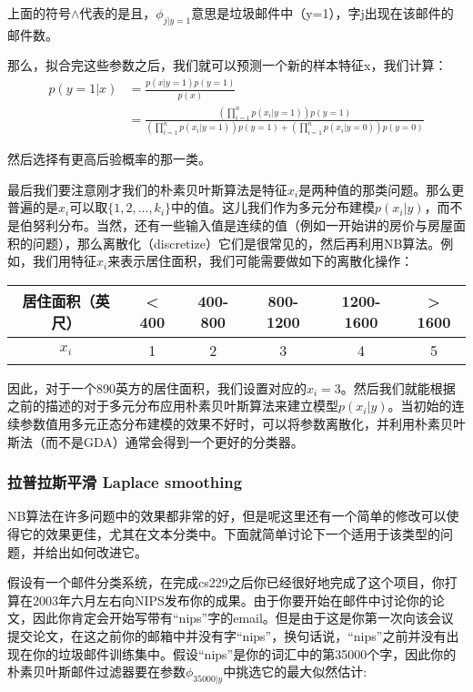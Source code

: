 \documentclass[UTF8]{ctexart}
\begin{document}
上面的符号$\land$代表的是且，$\phi_{j|y=1}$意思是垃圾邮件中（y=1），字j出现在该邮件的邮件数。

那么，拟合完这些参数之后，我们就可以预测一个新的样本特征x，我们计算：
\begin{align*}
p(y=1|x) & = \frac{p(x|y=1)p(y=1)}{p(x)}\\
& = \frac{(\prod_{i=1}^{n}p(x_{i}|y=1))p(y=1)}{(\prod_{i=1}^{n}p(x_{i}|y=1))p(y=1) + (\prod_{i=1}^{n}p(x_{i}|y=0))p(y=0)}
\end{align*}

然后选择有更高后验概率的那一类。


最后我们要注意刚才我们的朴素贝叶斯算法是特征$x_{i}$是两种值的那类问题。那么更普遍的是$x_{i}$可以取$\{1,2,...,k_{i}\}$中的值。这儿我们作为多元分布建模$p(x_{i}|y)$，而不是伯努利分布。当然，还有一些输入值是连续的值（例如一开始讲的房价与房屋面积的问题），那么离散化（discretize）它们是很常见的，然后再利用NB算法。例如，我们用特征$x_{i}$来表示居住面积，我们可能需要做如下的离散化操作：

\begin{tabular}{c|c|c|c|c|c}
居住面积（英尺）& < 400 & 400-800 & 800-1200 & 1200-1600 & > 1600 \\
\hline
$x_{i}$ & 1 & 2 & 3 & 4 & 5
\end{tabular}


因此，对于一个890英方的居住面积，我们设置对应的$x_{i}=3$。然后我们就能根据之前的描述的对于多元分布应用朴素贝叶斯算法来建立模型$p(x_{i}|y)$。当初始的连续参数值用多元正态分布建模的效果不好时，可以将参数离散化，并利用朴素贝叶斯法（而不是GDA）通常会得到一个更好的分类器。



\subsubsection{拉普拉斯平滑 Laplace smoothing}

NB算法在许多问题中的效果都非常的好，但是呢这里还有一个简单的修改可以使得它的效果更佳，尤其在文本分类中。下面就简单讨论下一个适用于该类型的问题，并给出如何改进它。

假设有一个邮件分类系统，在完成cs229之后你已经很好地完成了这个项目，你打算在2003年六月左右向NIPS发布你的成果。由于你要开始在邮件中讨论你的论文，因此你肯定会开始写带有“nips”字的email。但是由于这是你第一次向该会议提交论文，在这之前你的邮箱中并没有字“nips”，换句话说，“nips”之前并没有出现在你的垃圾邮件训练集中。假设“nips”是你的词汇中的第35000个字，因此你的朴素贝叶斯邮件过滤器要在参数$\phi_{35000|y}$中挑选它的最大似然估计:
\end{document}
